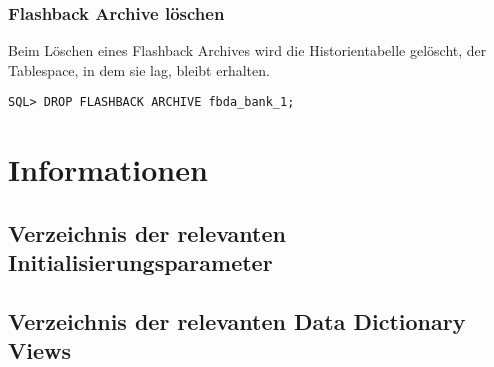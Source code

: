         \subsubsection{Flashback Archive löschen}
          Beim Löschen eines Flashback Archives wird die Historientabelle gelöscht, der Tablespace, in dem sie lag, bleibt erhalten.
          \begin{lstlisting}[caption={Flashback Data Archive deaktivieren},label=admin1743,language=oracle_sql]
SQL> DROP FLASHBACK ARCHIVE fbda_bank_1;
          \end{lstlisting}
    \section{Informationen}
      \subsection{Verzeichnis der relevanten Initialisierungsparameter}
        \begin{literaturinternet}
          \item \cite{REFRN10264}
        \end{literaturinternet}
      \subsection{Verzeichnis der relevanten Data Dictionary Views}
        \begin{literaturinternet}
          \item \cite{ADFNS01005}
          \item \cite{REFRN23342}
          \item \cite{sthref2545}
          \item \cite{sthref2202}
          \item \cite{REFRN23719}
          \item \cite{sthref2010}
        \end{literaturinternet}
